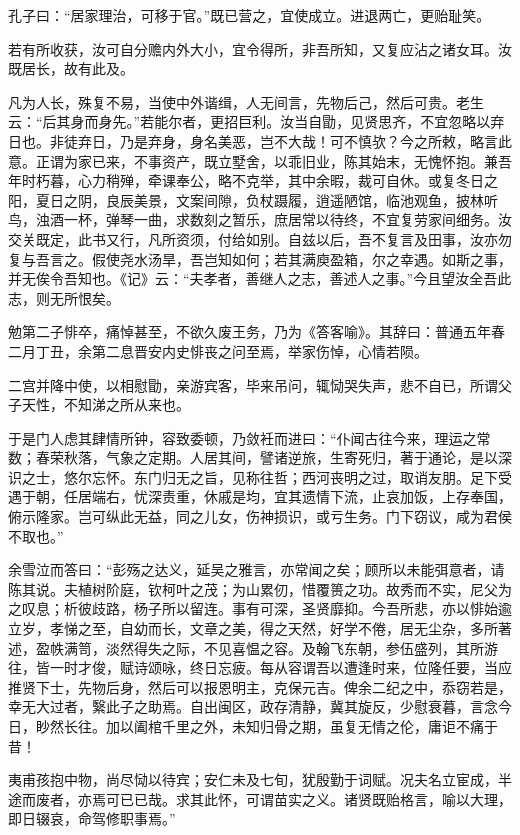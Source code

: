 \documentclass[12pt,UTF8]{ctexbook}
\begin{document}
孔子曰：“居家理治，可移于官。”既已营之，宜使成立。进退两亡，更贻耻笑。

若有所收获，汝可自分赡内外大小，宜令得所，非吾所知，又复应沾之诸女耳。汝既居长，故有此及。

凡为人长，殊复不易，当使中外谐缉，人无间言，先物后己，然后可贵。老生云：“后其身而身先。”若能尔者，更招巨利。汝当自勖，见贤思齐，不宜忽略以弃日也。非徒弃日，乃是弃身，身名美恶，岂不大哉！可不慎欤？今之所敕，略言此意。正谓为家已来，不事资产，既立墅舍，以乖旧业，陈其始末，无愧怀抱。兼吾年时朽暮，心力稍殚，牵课奉公，略不克举，其中余暇，裁可自休。或复冬日之阳，夏日之阴，良辰美景，文案间隙，负杖蹑履，逍遥陋馆，临池观鱼，披林听鸟，浊酒一杯，弹琴一曲，求数刻之暂乐，庶居常以待终，不宜复劳家间细务。汝交关既定，此书又行，凡所资须，付给如别。自兹以后，吾不复言及田事，汝亦勿复与吾言之。假使尧水汤旱，吾岂知如何；若其满庾盈箱，尔之幸遇。如斯之事，并无俟令吾知也。《记》云：“夫孝者，善继人之志，善述人之事。”今且望汝全吾此志，则无所恨矣。

勉第二子悱卒，痛悼甚至，不欲久废王务，乃为《答客喻》。其辞曰：普通五年春二月丁丑，余第二息晋安内史悱丧之问至焉，举家伤悼，心情若陨。

二宫并降中使，以相慰勖，亲游宾客，毕来吊问，辄恸哭失声，悲不自已，所谓父子天性，不知涕之所从来也。

于是门人虑其肆情所钟，容致委顿，乃敛衽而进曰：“仆闻古往今来，理运之常数；春荣秋落，气象之定期。人居其间，譬诸逆旅，生寄死归，著于通论，是以深识之士，悠尔忘怀。东门归无之旨，见称往哲；西河丧明之过，取诮友朋。足下受遇于朝，任居端右，忧深责重，休戚是均，宜其遗情下流，止哀加饭，上存奉国，俯示隆家。岂可纵此无益，同之儿女，伤神损识，或亏生务。门下窃议，咸为君侯不取也。”

余雪泣而答曰：“彭殇之达义，延吴之雅言，亦常闻之矣；顾所以未能弭意者，请陈其说。夫植树阶庭，钦柯叶之茂；为山累仞，惜覆篑之功。故秀而不实，尼父为之叹息；析彼歧路，杨子所以留连。事有可深，圣贤靡抑。今吾所悲，亦以悱始逾立岁，孝悌之至，自幼而长，文章之美，得之天然，好学不倦，居无尘杂，多所著述，盈帙满笥，淡然得失之际，不见喜愠之容。及翰飞东朝，参伍盛列，其所游往，皆一时才俊，赋诗颂咏，终日忘疲。每从容谓吾以遭逢时来，位隆任要，当应推贤下士，先物后身，然后可以报恩明主，克保元吉。俾余二纪之中，忝窃若是，幸无大过者，繄此子之助焉。自出闽区，政存清静，冀其旋反，少慰衰暮，言念今日，眇然长往。加以阖棺千里之外，未知归骨之期，虽复无情之伦，庸讵不痛于昔！

夷甫孩抱中物，尚尽恸以待宾；安仁未及七旬，犹殷勤于词赋。况夫名立宦成，半途而废者，亦焉可已已哉。求其此怀，可谓苗实之义。诸贤既贻格言，喻以大理，即日辍哀，命驾修职事焉。”
\end{document}
